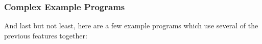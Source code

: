 \documentclass[12pt,twoside]{report}
\begin{document}
\subsubsection{Complex Example Programs}
And last but not least, here are a few example programs which use several of the previous features together:

\cleardoublepage






\end{document}
